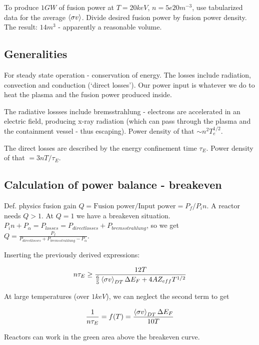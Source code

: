 \documentclass[PlasmaNotes.tex]{subfiles}
\begin{document}
To produce $1GW$ of fusion power at $T=20keV$, $n=5e20 m^{-3}$, use tabularized data for the average $\left< \sigma v \right>$. Divide desired fusion power by fusion power density. The result: $14 m^3$ - apparently a reasonable volume.

\subsection{Generalities}

For steady state operation - conservation of energy. The losses include radiation, convection and conduction (`direct losses'). Our power input is whatever we do to heat the plasma and the fusion power produced inside.

The radiative lossses include bremsstrahlung - electrons are accelerated in an electric field, producing x-ray radiation (which can pass through the plasma and the containment vessel - thus escaping). Power density of that $\sim n^2 T_e^{1/2}$.

The direct losses are described by the energy confinement time $\tau_E$. Power density of that $=3nT/\tau_E$.

\subsection{Calculation of power balance - breakeven}

Def. physics fusion gain $Q=\text{Fusion power/Input power} = P_f/P_in$. A reactor needs $Q>1$. At $Q=1$ we have a breakeven situation. $P_in + P_\alpha = P_{losses} = P_{direct losses} + P_{bremsstrahlung}$, so we get $Q=\frac{P_f}{P_{direct losses} + P_{bremsstrahlung} - P_{\alpha}}$.

Inserting the previously derived expressions:

\begin{equation}
 n \tau_E \geq \frac{12 T}{\frac{6}{5} \left< \sigma v \right>_{DT} \Delta E_F + 4 A Z_{eff} T^{1/2}}
\end{equation}

At large temperatures (over $1 keV$), we can neglect the second term to get

\begin{equation}
\frac{1}{n \tau_E} = f(T) = \frac{\left< \sigma v \right>_{DT} \Delta E_F}{10 T}
\end{equation}


Reactors can work in the green area above the breakeven curve.
\end{document}
